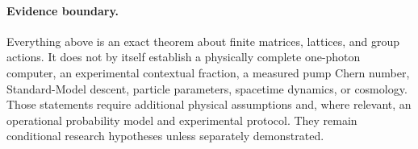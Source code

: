 \paragraph{Evidence boundary.}
Everything above is an exact theorem about finite matrices, lattices, and group
actions.  It does not by itself establish a physically complete one-photon
computer, an experimental contextual fraction, a measured pump Chern number,
Standard-Model descent, particle parameters, spacetime dynamics, or cosmology.
Those statements require additional physical assumptions and, where relevant,
an operational probability model and experimental protocol.  They remain
conditional research hypotheses unless separately demonstrated.
